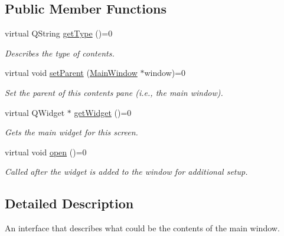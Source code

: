 \subsection*{Public Member Functions}
\begin{DoxyCompactItemize}
\item 
virtual Q\-String \hyperlink{class_u_i_1_1_window_contents_a0aa534c857688f60cf7fe844d4504516}{get\-Type} ()=0
\begin{DoxyCompactList}\small\item\em Describes the type of contents. \end{DoxyCompactList}\item 
virtual void \hyperlink{class_u_i_1_1_window_contents_a2f1dd5b66e7941d01bb1a2635d661df0}{set\-Parent} (\hyperlink{class_u_i_1_1_main_window}{Main\-Window} $\ast$window)=0
\begin{DoxyCompactList}\small\item\em Set the parent of this contents pane (i.\-e., the main window). \end{DoxyCompactList}\item 
virtual Q\-Widget $\ast$ \hyperlink{class_u_i_1_1_window_contents_a7fddee7afb08f1e6ea709e1b574db618}{get\-Widget} ()=0
\begin{DoxyCompactList}\small\item\em Gets the main widget for this screen. \end{DoxyCompactList}\item 
\hypertarget{class_u_i_1_1_window_contents_a76327085ad35fab2d79120fe03c7ab89}{virtual void \hyperlink{class_u_i_1_1_window_contents_a76327085ad35fab2d79120fe03c7ab89}{open} ()=0}\label{class_u_i_1_1_window_contents_a76327085ad35fab2d79120fe03c7ab89}

\begin{DoxyCompactList}\small\item\em Called after the widget is added to the window for additional setup. \end{DoxyCompactList}\end{DoxyCompactItemize}


\subsection{Detailed Description}
An interface that describes what could be the contents of the main window. 

